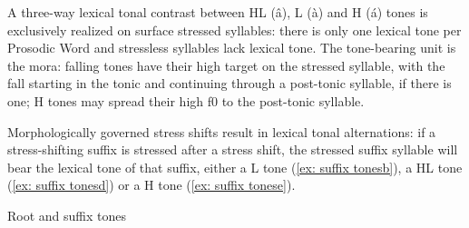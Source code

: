 A three-way lexical tonal contrast between HL (â), L (à) and H (á) tones is exclusively realized on surface stressed syllables: there is only one lexical tone per Prosodic Word and stressless syllables lack lexical tone. The tone-bearing unit is the mora: falling tones have their high target on the stressed syllable, with the fall starting in the tonic and continuing through a post-tonic syllable, if there is one; H tones may spread their high f0 to the post-tonic syllable.

Morphologically governed stress shifts result in lexical tonal alternations: if a stress-shifting suffix is stressed after a stress shift, the stressed suffix syllable will bear the lexical tone of that suffix, either a L tone (\ref{ex: suffix tonesb}), a HL tone (\ref{ex: suffix tonesd}) or a H tone (\ref{ex: suffix tonese}).

\largerpage
\ea\label{ex: suffix tones}
{Root and suffix tones}

